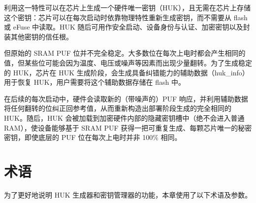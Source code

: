 \documentclass[main\_\_CN.tex]{subfiles}
\begin{document}
利用这一特性可以在芯片上生成一个硬件唯一密钥（HUK），且无需在芯片上存储这个密钥：芯片可以在每次启动时依靠物理特性重新生成密钥，而不需要从 flash 或 eFuse 中读取。HUK 随后可用作安全启动、设备身份与认证、加密密钥以及封装其他密钥的信任根。

但原始的 SRAM PUF 位并不完全稳定。大多数位在每次上电时都会产生相同的值，但某些位可能会因为温度、电压或噪声等因素而出现少量翻转。为了生成稳定的 HUK，芯片在 HUK 生成阶段，会生成具备纠错能力的辅助数据（huk\_info）用于恢复 HUK，用户需要将这个辅助数据存储在 flash 中。

在后续的每次启动中，硬件会读取新的（带噪声的）PUF 响应，并利用辅助数据将任何翻转的位纠正回参考值，从而重新构造出部署阶段生成的完全相同的 HUK。随后，HUK 会被加载到加密硬件内部的隐藏密钥槽中（绝不会进入普通 RAM），使设备能够基于 SRAM PUF 获得一把可重复生成、每颗芯片唯一的秘密密钥，即使底层的 PUF 位在每次上电时并非 100\% 相同。

\section{术语}

为了更好地说明 HUK 生成器和密钥管理器的功能，本章使用了以下术语及参数。
\end{document}
